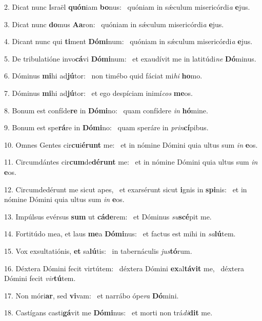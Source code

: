 2. Dicat nunc Israël \textbf{quón}iam \textbf{bo}nus: \ast\  quóniam in sǽculum misericórdi\textit{a} \textbf{e}jus.\

3. Dicat nunc \textbf{do}mus \textbf{A}\textbf{a}ron: \ast\  quóniam in sǽculum misericórdi\textit{a} \textbf{e}jus.\

4. Dicant nunc qui \textbf{ti}ment \textbf{Dó}\textbf{mi}num: \ast\  quóniam in sǽculum misericórdi\textit{a} \textbf{e}jus.\

5. De tribulatióne invo\textbf{cá}vi \textbf{Dó}\textbf{mi}num: \ast\  et exaudívit me in latitúdi\textit{ne} \textbf{Dó}minus.\

6. Dóminus \textbf{mi}hi ad\textbf{jú}tor: \ast\  non timébo quid fáciat mi\textit{hi} \textbf{ho}mo.\

7. Dóminus \textbf{mi}hi ad\textbf{jú}tor: \ast\  et ego despíciam inimí\textit{cos} \textbf{me}os.\

8. Bonum est confíde\textbf{re} in \textbf{Dó}\textbf{mi}no: \ast\  quam confídere \textit{in} \textbf{hó}mine.\

9. Bonum est spe\textbf{rá}re in \textbf{Dó}\textbf{mi}no: \ast\  quam speráre in \textit{prin}\textbf{cí}pibus.\

10. Omnes Gentes cir\textbf{cu}i\textbf{é}\textbf{runt} me: \ast\  et in nómine Dómini quia ultus sum \textit{in} \textbf{e}os.\

11. Circumdántes cir\textbf{cum}de\textbf{dé}\textbf{runt} me: \ast\  et in nómine Dómini quia ultus sum \textit{in} \textbf{e}os.\

12. Circumdedérunt me sicut apes, \dag\  et exarsérunt sicut \textbf{i}gnis in \textbf{spi}nis: \ast\  et in nómine Dómini quia ultus sum \textit{in} \textbf{e}os.\

13. Impúlsus evérsus \textbf{sum} ut \textbf{cá}\textbf{de}rem: \ast\  et Dóminus \textit{su}\textbf{scé}pit me.\

14. Fortitúdo mea, et laus \textbf{me}a \textbf{Dó}\textbf{mi}nus: \ast\  et factus est mihi in \textit{sa}\textbf{lú}tem.\

15. Vox exsultatiónis, \textbf{et} sa\textbf{lú}tis: \ast\  in tabernáculis \textit{jus}\textbf{tó}rum.\

16. Déxtera Dómini fecit virtútem: \dag\  déxtera Dómini \textbf{ex}al\textbf{tá}\textbf{vit} me, \ast\  déxtera Dómini fecit \textit{vir}\textbf{tú}tem.\

17. Non móri\textbf{ar}, sed \textbf{vi}vam: \ast\  et narrábo ópe\textit{ra} \textbf{Dó}mini.\

18. Castígans casti\textbf{gá}vit me \textbf{Dó}\textbf{mi}nus: \ast\  et morti non trá\textit{di}\textbf{dit} me.\

